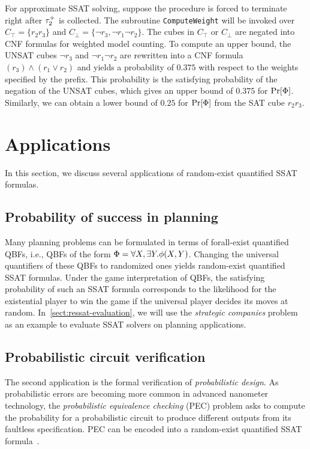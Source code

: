 \begin{example}
    For approximate SSAT solving, suppose the procedure is forced to terminate right after $\tau_2^+$ is collected.
    The subroutine \texttt{ComputeWeight} will be invoked over $C_\top=\{r_2r_3\}$ and $C_\bot=\{\lnot r_3,\lnot r_1 \lnot r_2\}$.
    The cubes in $C_\top$ or $C_\bot$ are negated into CNF formulas for weighted model counting.
    To compute an upper bound,
    the UNSAT cubes $\lnot r_3$ and $\lnot r_1 \lnot r_2$ are rewritten into a CNF formula $(r_3)\land(r_1 \lor r_2)$ and yields a probability of $0.375$ with respect to the weights specified by the prefix.
    This probability is the satisfying probability of the negation of the UNSAT cubes,
    which gives an upper bound of $0.375$ for $\Pr[\Phi]$.
    Similarly, we can obtain a lower bound of $0.25$ for $\Pr[\Phi]$ from the SAT cube $r_2 r_3$.
\end{example}

\section{Applications}
In this section, we discuss several applications of random-exist quantified SSAT formulas.

\subsection{Probability of success in planning}
Many planning problems can be formulated in terms of forall-exist quantified QBFs,
i.e., QBFs of the form $\Phi=\forall X,\exists Y.\phi(X,Y)$.
Changing the universal quantifiers of these QBFs to randomized ones yields random-exist quantified SSAT formulas.
Under the game interpretation of QBFs,
the satisfying probability of such an SSAT formula corresponds to the likelihood
for the existential player to win the game if the universal player decides its moves at random.
In~\cref{sect:ressat-evaluation},
we will use the \textit{strategic companies} problem~\cite{Cadoli1997} as an example
to evaluate SSAT solvers on planning applications.

\subsection{Probabilistic circuit verification}
The second application is the formal verification of \textit{probabilistic design}.
As probabilistic errors are becoming more common in advanced nanometer technology,
the \textit{probabilistic equivalence checking} (PEC) problem asks to compute the probability for a probabilistic circuit to produce different outputs from its faultless specification.
PEC can be encoded into a random-exist quantified SSAT formula~\cite{LeeTC18ProbDesign}.

